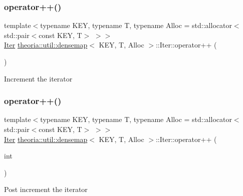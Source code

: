 \subsubsection{\texorpdfstring{operator++()}{operator++()}\hspace{0.1cm}{\footnotesize\ttfamily [1/2]}}
{\footnotesize\ttfamily template$<$typename K\+EY, typename T, typename Alloc = std\+::allocator$<$std\+::pair$<$const K\+E\+Y, T$>$ $>$$>$ \\
\hyperlink{classtheoria_1_1util_1_1densemap_1_1Iter}{Iter} \hyperlink{classtheoria_1_1util_1_1densemap}{theoria\+::util\+::densemap}$<$ K\+EY, T, Alloc $>$\+::Iter\+::operator++ (\begin{DoxyParamCaption}{ }\end{DoxyParamCaption})\hspace{0.3cm}{\ttfamily [inline]}}

Increment the iterator \mbox{\label{classtheoria_1_1util_1_1densemap_1_1Iter_aa31a8c83fd8fefd48b6d43b778acbee5}} 
\subsubsection{\texorpdfstring{operator++()}{operator++()}\hspace{0.1cm}{\footnotesize\ttfamily [2/2]}}
{\footnotesize\ttfamily template$<$typename K\+EY, typename T, typename Alloc = std\+::allocator$<$std\+::pair$<$const K\+E\+Y, T$>$ $>$$>$ \\
\hyperlink{classtheoria_1_1util_1_1densemap_1_1Iter}{Iter} \hyperlink{classtheoria_1_1util_1_1densemap}{theoria\+::util\+::densemap}$<$ K\+EY, T, Alloc $>$\+::Iter\+::operator++ (\begin{DoxyParamCaption}\item[{int}]{ }\end{DoxyParamCaption})\hspace{0.3cm}{\ttfamily [inline]}}

Post increment the iterator \mbox{\label{classtheoria_1_1util_1_1densemap_1_1Iter_af31574e922ff523a77166683a1f12249}} 
